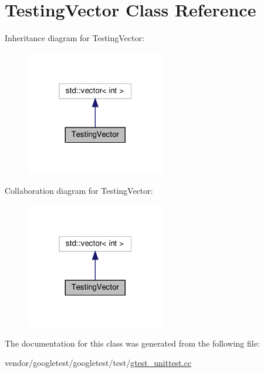 \hypertarget{class_testing_vector}{}\section{Testing\+Vector Class Reference}
\label{class_testing_vector}


Inheritance diagram for Testing\+Vector\+:
\nopagebreak
\begin{figure}[H]
\begin{center}
\leavevmode
\includegraphics[width=172pt]{class_testing_vector__inherit__graph}
\end{center}
\end{figure}


Collaboration diagram for Testing\+Vector\+:
\nopagebreak
\begin{figure}[H]
\begin{center}
\leavevmode
\includegraphics[width=172pt]{class_testing_vector__coll__graph}
\end{center}
\end{figure}


The documentation for this class was generated from the following file\+:\begin{DoxyCompactItemize}
\item 
vendor/googletest/googletest/test/\hyperlink{gtest__unittest_8cc}{gtest\+\_\+unittest.\+cc}\end{DoxyCompactItemize}
